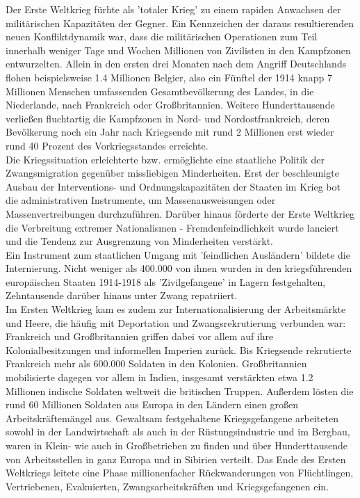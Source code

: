 \documentclass[letterpaper, 12pt]{article}
\begin{document}
Der Erste Weltkrieg fürhte als 'totaler Krieg' zu einem rapiden Anwachsen der militärischen Kapazitäten der Gegner. Ein Kennzeichen der daraus resultierenden neuen Konfliktdynamik war, dass die militärischen Operationen zum Teil innerhalb weniger Tage und Wochen Millionen von Zivilisten in den Kampfzonen entwurzelten. Allein in den ersten drei Monaten nach dem Angriff Deutschlands flohen beispielsweise 1.4 Millionen Belgier, also ein Fünftel der 1914 knapp 7 Millionen Menschen umfassenden Gesamtbevölkerung des Landes, in die Niederlande, nach Frankreich oder Großbritannien. Weitere Hunderttausende verließen fluchtartig die Kampfzonen in Nord- und Nordostfrankreich, deren Bevölkerung noch ein Jahr nach Kriegsende mit rund 2 Millionen erst wieder rund 40 Prozent des Vorkriegsstandes erreichte. \\
Die Kriegssituation erleichterte bzw. ermöglichte eine staatliche Politik der Zwangsmigration gegenüber missliebigen Minderheiten. Erst der beschleunigte Ausbau der Interventions- und Ordnungskapazitäten der Staaten im Krieg bot die administrativen Instrumente, um Massenausweisungen oder Massenvertreibungen durchzuführen. Darüber hinaus förderte der Erste Weltkrieg die Verbreitung extremer Nationalismen - Fremdenfeindlichkeit wurde lanciert und die Tendenz zur Ausgrenzung von Minderheiten verstärkt. \\
Ein Instrument zum staatlichen Umgang mit 'feindlichen Ausländern' bildete die Internierung. Nicht weniger als 400.000 von ihnen wurden in den kriegsführenden europäischen Staaten 1914-1918 als 'Zivilgefangene' in Lagern festgehalten, Zehntausende darüber hinaus unter Zwang repatriiert. \\
Im Ersten Weltkrieg kam es zudem zur Internationalisierung der Arbeitsmärkte und Heere, die häufig mit Deportation und Zwangsrekrutierung verbunden war: Frankreich und Großbritannien griffen dabei vor allem auf ihre Kolonialbesitzungen und informellen Imperien zurück. Bis Kriegsende rekrutierte Frankreich mehr als 600.000 Soldaten in den Kolonien. Großbritannien mobilisierte dagegen vor allem in Indien, insgesamt verstärkten etwa 1.2 Millionen indische Soldaten weltweit die britischen Truppen. \clearpage
Außerdem lösten die rund 60 Millionen Soldaten aus Europa in den Ländern einen großen Arbeitskräftemängel aus. Gewaltsam festgehaltene Kriegsgefangene arbeiteten sowohl in der Landwirtschaft als auch in der Rüstungsindustrie und im Bergbau, waren in Klein- wie auch in Großbetrieben zu finden und über Hunderttausende von Arbeitsstellen in ganz Europa und in Sibirien verteilt. Das Ende des Ersten Weltkriegs leitete eine Phase millionenfacher Rückwanderungen von Flüchtlingen, Vertriebenen, Evakuierten, Zwangsarbeitskräften und Kriegsgefangenen ein.
\end{document}
